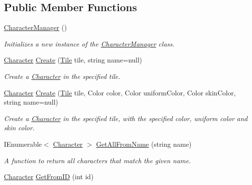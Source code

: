\subsection*{Public Member Functions}
\begin{DoxyCompactItemize}
\item 
\hyperlink{class_project_porcupine_1_1_entities_1_1_character_manager_ab14467714097458d428428ee18fe6a76}{Character\+Manager} ()
\begin{DoxyCompactList}\small\item\em Initializes a new instance of the \hyperlink{class_project_porcupine_1_1_entities_1_1_character_manager}{Character\+Manager} class. \end{DoxyCompactList}\item 
\hyperlink{class_project_porcupine_1_1_entities_1_1_character}{Character} \hyperlink{class_project_porcupine_1_1_entities_1_1_character_manager_ae0f5194163caf61bbc59dc263fbd4e8b}{Create} (\hyperlink{class_tile}{Tile} tile, string name=null)
\begin{DoxyCompactList}\small\item\em Create a \hyperlink{class_project_porcupine_1_1_entities_1_1_character}{Character} in the specified tile. \end{DoxyCompactList}\item 
\hyperlink{class_project_porcupine_1_1_entities_1_1_character}{Character} \hyperlink{class_project_porcupine_1_1_entities_1_1_character_manager_aa047fc884e4067303d3aeeba1405d6dd}{Create} (\hyperlink{class_tile}{Tile} tile, Color color, Color uniform\+Color, Color skin\+Color, string name=null)
\begin{DoxyCompactList}\small\item\em Create a \hyperlink{class_project_porcupine_1_1_entities_1_1_character}{Character} in the specified tile, with the specified color, uniform color and skin color. \end{DoxyCompactList}\item 
I\+Enumerable$<$ \hyperlink{class_project_porcupine_1_1_entities_1_1_character}{Character} $>$ \hyperlink{class_project_porcupine_1_1_entities_1_1_character_manager_a3a19765654a5c1d8cd88bdf28ccba9ef}{Get\+All\+From\+Name} (string name)
\begin{DoxyCompactList}\small\item\em A function to return all characters that match the given name. \end{DoxyCompactList}\item 
\hyperlink{class_project_porcupine_1_1_entities_1_1_character}{Character} \hyperlink{class_project_porcupine_1_1_entities_1_1_character_manager_a78609b299737390c470ae939a9a00bd9}{Get\+From\+ID} (int id)

\end{DoxyCompactItemize}
